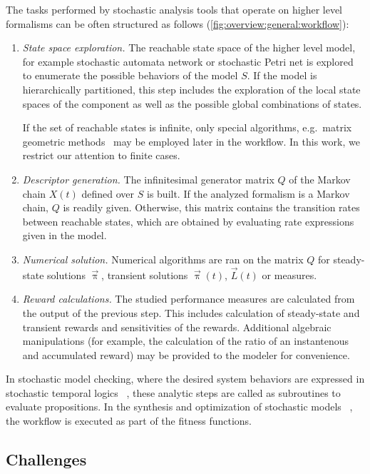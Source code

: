 The tasks performed by stochastic analysis tools that operate on
higher level formalisms can be often structured as follows
(\vref{fig:overview:general:workflow}):
\begin{enumerate}
\item \emph{State space exploration.} The reachable state space of the
  higher level model, for example stochastic automata network or
  stochastic Petri net is explored to enumerate the possible behaviors of the model $S$. If the model is hierarchically partitioned, this step includes the exploration of the local state
  spaces of the component as well as the possible global combinations
  of states.

  If the set of reachable states is infinite, only special algorithms,
  e.g.~matrix geometric methods~\citep{haverkort1995matrix} may be
  employed later in the workflow. In this work, we restrict our
  attention to finite cases.
\item \emph{Descriptor generation.} The infinitesimal generator matrix
  $Q$ of the Markov chain $X(t)$ defined over $S$ is built. If the
  analyzed formalism is a Markov chain, $Q$ is readily
  given. Otherwise, this matrix contains the transition rates between
  reachable states, which are obtained by evaluating rate expressions
  given in the model.
\item \emph{Numerical solution.} Numerical algorithms are ran on the
  matrix $Q$ for steady-state solutions $\vec{\uppi}$, transient
  solutions $\vec{\uppi}(t)$, $\vec{L}(t)$ or  measures.
\item \emph{Reward calculations.} The studied performance measures are
  calculated from the output of the previous step. This includes
  calculation of steady-state and transient rewards and sensitivities
  of the rewards. Additional algebraic manipulations (for example, the
  calculation of the ratio of an instantenous and accumulated reward)
  may be provided to the modeler for convenience.

\end{enumerate}

In stochastic model checking, where the desired system behaviors are
expressed in stochastic temporal logics%
~\citep{bianco1995model,baier1999approximative}, these analytic steps
are called as subroutines to evaluate propositions. In the synthesis and
optimization of stochastic models%
~\citep{DBLP:journals/jacm/ChatterjeeHJ015}, the workflow is executed
as part of the fitness functions.

\subsection{Challenges}


